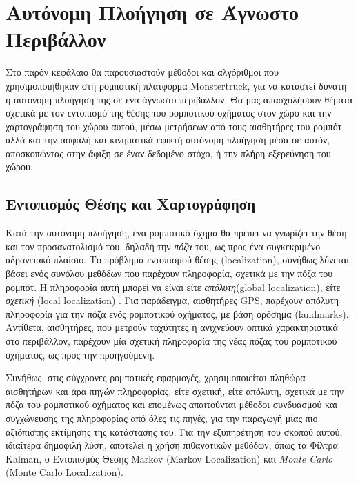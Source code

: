 
\chapter{Αυτόνομη Πλοήγηση σε Άγνωστο Περιβάλλον} %
\label{Chapter3} %

Στο παρόν κεφάλαιο θα παρουσιαστούν μέθοδοι και αλγόριθμοι που χρησιμοποιήθηκαν στη ρομποτική πλατφόρμα Monstertruck, για να καταστεί δυνατή η αυτόνομη πλοήγηση της σε ένα άγνωστο περιβάλλον. Θα μας απασχολήσουν θέματα σχετικά με τον εντοπισμό της θέσης του ρομποτικού οχήματος στον χώρο και την χαρτογράφηση του χώρου αυτού, μέσω μετρήσεων από τους αισθητήρες του ρομπότ αλλά και την ασφαλή και κινηματικά εφικτή αυτόνομη πλοήγηση μέσα σε αυτόν, αποσκοπώντας στην άφιξη σε έναν δεδομένο στόχο, ή την πλήρη εξερεύνηση του χώρου.

\section{Εντοπισμός Θέσης και Χαρτογράφηση} \label{sec:localization_and_mapping}
Κατά την αυτόνομη πλοήγηση, ένα ρομποτικό όχημα θα πρέπει να γνωρίζει την θέση και τον προσανατολισμό του, δηλαδή την \textit{πόζα} του, ως προς ένα συγκεκριμένο αδρανειακό πλαίσιο. Το πρόβλημα εντοπισμού θέσης (localization), συνήθως λύνεται βάσει ενός συνόλου μεθόδων που παρέχουν πληροφορία, σχετικά με την πόζα του ρομπότ. Η πληροφορία αυτή μπορεί να είναι είτε \textit{απόλυτη}(global localization), είτε \textit{σχετική} (local localization) \cite{autonomous_land_vehicles}. Για παράδειγμα, αισθητήρες GPS, παρέχουν απόλυτη πληροφορία για την πόζα ενός ρομποτικού οχήματος, με βάση ορόσημα (landmarks). Αντίθετα, αισθητήρες, που μετρούν ταχύτητες ή ανιχνεύουν οπτικά χαρακτηριστικά στο περιβάλλον, παρέχουν μία σχετική πληροφορία της νέας πόζας του ρομποτικού οχήματος, ως προς την προηγούμενη.

\bigskip
Συνήθως, στις σύγχρονες ρομποτικές εφαρμογές, χρησιμοποιείται πληθώρα αισθητήρων και άρα πηγών πληροφορίας, είτε σχετική, είτε απόλυτη, σχετικά με την πόζα του ρομποτικού οχήματος και επομένως απαιτούνται μέθοδοι συνδυασμού και συγχώνευσης της πληροφορίας από όλες τις πηγές, για την παραγωγή μίας πιο αξιόπιστης εκτίμησης της κατάστασης του. Για την εξυπηρέτηση του σκοπού αυτού, ιδιαίτερα δημοφιλή λύση, αποτελεί η χρήση πιθανοτικών μεθόδων, όπως τα {Φίλτρα Kalman}, ο {Εντοπισμός Θέσης Markov} ({Markov Localization}) και \textit{Monte Carlo} ({Monte Carlo Localization}).

